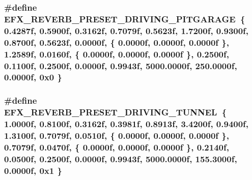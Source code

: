 \subsubsection[{\texorpdfstring{E\+F\+X\+\_\+\+R\+E\+V\+E\+R\+B\+\_\+\+P\+R\+E\+S\+E\+T\+\_\+\+D\+R\+I\+V\+I\+N\+G\+\_\+\+P\+I\+T\+G\+A\+R\+A\+GE}{EFX_REVERB_PRESET_DRIVING_PITGARAGE}}]{\setlength{\rightskip}{0pt plus 5cm}\#define E\+F\+X\+\_\+\+R\+E\+V\+E\+R\+B\+\_\+\+P\+R\+E\+S\+E\+T\+\_\+\+D\+R\+I\+V\+I\+N\+G\+\_\+\+P\+I\+T\+G\+A\+R\+A\+GE~\{ 0.\+4287f, 0.\+5900f, 0.\+3162f, 0.\+7079f, 0.\+5623f, 1.\+7200f, 0.\+9300f, 0.\+8700f, 0.\+5623f, 0.\+0000f, \{ 0.\+0000f, 0.\+0000f, 0.\+0000f \}, 1.\+2589f, 0.\+0160f, \{ 0.\+0000f, 0.\+0000f, 0.\+0000f \}, 0.\+2500f, 0.\+1100f, 0.\+2500f, 0.\+0000f, 0.\+9943f, 5000.\+0000f, 250.\+0000f, 0.\+0000f, 0x0 \}}\hypertarget{efx-presets_8h_a444a33cea9eb540432f42b5d4b0486a8}{}\label{efx-presets_8h_a444a33cea9eb540432f42b5d4b0486a8}
\subsubsection[{\texorpdfstring{E\+F\+X\+\_\+\+R\+E\+V\+E\+R\+B\+\_\+\+P\+R\+E\+S\+E\+T\+\_\+\+D\+R\+I\+V\+I\+N\+G\+\_\+\+T\+U\+N\+N\+EL}{EFX_REVERB_PRESET_DRIVING_TUNNEL}}]{\setlength{\rightskip}{0pt plus 5cm}\#define E\+F\+X\+\_\+\+R\+E\+V\+E\+R\+B\+\_\+\+P\+R\+E\+S\+E\+T\+\_\+\+D\+R\+I\+V\+I\+N\+G\+\_\+\+T\+U\+N\+N\+EL~\{ 1.\+0000f, 0.\+8100f, 0.\+3162f, 0.\+3981f, 0.\+8913f, 3.\+4200f, 0.\+9400f, 1.\+3100f, 0.\+7079f, 0.\+0510f, \{ 0.\+0000f, 0.\+0000f, 0.\+0000f \}, 0.\+7079f, 0.\+0470f, \{ 0.\+0000f, 0.\+0000f, 0.\+0000f \}, 0.\+2140f, 0.\+0500f, 0.\+2500f, 0.\+0000f, 0.\+9943f, 5000.\+0000f, 155.\+3000f, 0.\+0000f, 0x1 \}}\hypertarget{efx-presets_8h_abdc865e490c2ea43f97a7c2db574f917}{}\label{efx-presets_8h_abdc865e490c2ea43f97a7c2db574f917}
